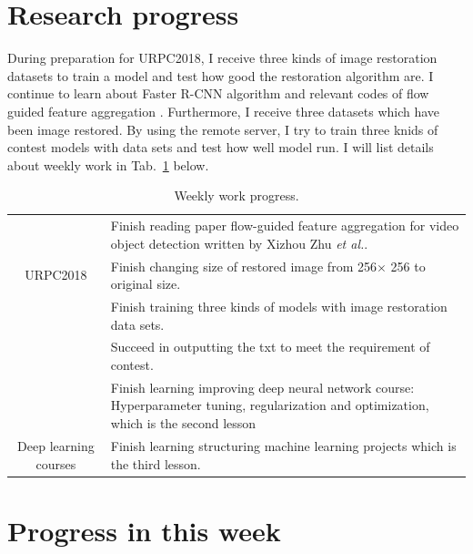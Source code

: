 \documentclass[a4paper]{article}
\begin{document}
\section{Research progress}

During preparation for URPC2018, I receive three kinds of image restoration datasets to train a model and test how good the restoration algorithm are. I continue to learn about Faster R-CNN algorithm \cite{Ren2015Faster} and  relevant codes of flow guided feature aggregation \cite{zhu17fgfa}. Furthermore, I receive three datasets which have been image restored. By using the remote server, I try to train three knids of contest models with data sets and test how well model run. I will list details about weekly work in Tab.~\ref{t1} below. 

\begin{table}[hb]
	\centering
	\caption{Weekly work progress.}
	\begin{tabular}{c|p{10cm}}
		\hline 
		& Finish reading paper flow-guided feature aggregation for video object detection written by Xizhou Zhu \emph{et al.}.\\
		
		URPC2018 & Finish changing size of restored image from 256$\times$ 256 to original size. \\
		
		& Finish training three kinds of models with image restoration data sets.\\
		
		& Succeed in outputting the txt to meet the requirement of contest.\\
		\hline
		& Finish learning improving deep neural network course: Hyperparameter tuning, regularization and optimization, which is the second lesson \\
		Deep learning courses & Finish learning structuring machine learning projects which is the third lesson. \\
		\hline
	\end{tabular}
	\label{t1}
\end{table} 


\section{Progress in this week}
\end{document}
